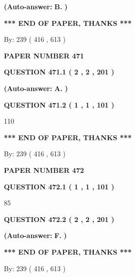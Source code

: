 \documentclass[12pt]{article}
\begin{document}
 
{\textbf{(Auto-answer:}}
{\textbf{\large{
B.}}}
{\textbf{)}}
 
 
   
   
   
   
\vspace{1.0in} 
{\textbf{\large{ *** END OF PAPER, THANKS *** }}} 
   
   
\hspace{1.0in} By: 
 239 ( 416 ,  613 )
   
   
   
   
\newpage 
\setcounter{page}{ 
   471001 } 
   
   
 {\textbf{ \Large{ PAPER NUMBER  471  }}}
   
   
   
   
  
  
{\textbf{\large{QUESTION
471.1 
 ( 2 , 2 , 201 )
}}}
 
 
{\textbf{(Auto-answer:}}
{\textbf{\large{
A.}}}
{\textbf{)}}
 
 
  
  
{\textbf{\large{QUESTION
471.2 
 ( 1 , 1 , 101 )
}}}

110
   
   
   
   
\vspace{1.0in} 
{\textbf{\large{ *** END OF PAPER, THANKS *** }}} 
   
   
\hspace{1.0in} By: 
 239 ( 416 ,  613 )
   
   
   
   
\newpage 
\setcounter{page}{ 
   472001 } 
   
   
 {\textbf{ \Large{ PAPER NUMBER  472  }}}
   
   
   
   
  
  
{\textbf{\large{QUESTION
472.1 
 ( 1 , 1 , 101 )
}}}

85
  
  
{\textbf{\large{QUESTION
472.2 
 ( 2 , 2 , 201 )
}}}
 
 
{\textbf{(Auto-answer:}}
{\textbf{\large{
F.}}}
{\textbf{)}}
 
 
   
   
   
   
\vspace{1.0in} 
{\textbf{\large{ *** END OF PAPER, THANKS *** }}} 
   
   
\hspace{1.0in} By: 
 239 ( 416 ,  613 )
   
   
   
\end{document}
